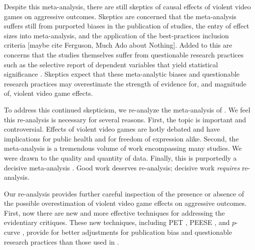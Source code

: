 \documentclass[man]{apa6}
\begin{document}
Despite this meta-analysis, there are still skeptics of causal effects of violent video games on aggressive outcomes.  Skeptics are concerned that the \citet{Anderson:etal:2010} meta-analysis suffers still from purported biases in the publication of studies, the entry of effect sizes into meta-analysis, and the application of the best-practices inclusion criteria [maybe cite Ferguson, Much Ado about Nothing].  Added to this are concerns that the studies themselves suffer from questionable research practices such as the selective report of dependent variables that yield statistical significance \citep{Elson:etal:2014}. Skeptics expect that these meta-analytic biases and questionable research practices may overestimate the strength of evidence for, and magnitude of, violent video game effects.

To address this continued skepticism, we re-analyze the meta-analysis of \citet{Anderson:etal:2010}. We feel this re-analysis is necessary for several reasons.
First, the topic is important and controversial. Effects of violent video games are hotly debated and have implications for public health and for freedom of expression alike. Second, the \citet{Anderson:etal:2010} meta-analysis is a tremendous volume of work encompassing many studies. We were drawn to the quality and quantity of data. Finally, this is purportedly a decisive meta-analysis \citep[see][]{Huesmann:2010}. Good work deserves re-analysis; decisive work {\em requires} re-analysis.

Our re-analysis provides further careful inspection of the presence or absence of the possible overestimation of violent video game effects on aggressive outcomes. First, now there are new and more effective techniques for addressing the evidentiary critiques.  These new techniques, including PET \citep[Precision-Effect Test,][]{Stanley:Doucouliagos:2014}, PEESE \citep[Precision-Effect Estimate with Standard Error,][]{Stanley:Doucouliagos:2014}, and $p$-curve \citep{Simonsohn:etal:2014,Simonsohn:etal:2014b}, provide for better adjustments for publication bias and questionable research practices than those used in \citet{Anderson:etal:2010}. 

\end{document}
